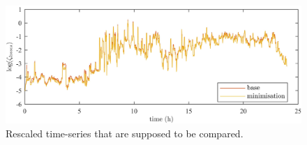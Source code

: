 \begin{figure}\centering
	\includegraphics{_appendices/_a1/fig/log-cost}
	\caption{Rescaled time-series that are supposed to be compared.}
	\label{appx-a:ch1:fig:log-data}
\end{figure}